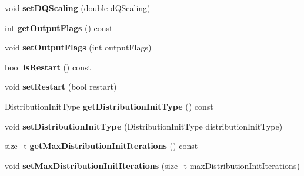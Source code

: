 \begin{DoxyCompactItemize}
\item 
\hypertarget{classnatrium_1_1SolverConfiguration_a25f4b8ac9b325f455c5c273d75ed7551}{void {\bfseries set\-D\-Q\-Scaling} (double d\-Q\-Scaling)}\label{classnatrium_1_1SolverConfiguration_a25f4b8ac9b325f455c5c273d75ed7551}

\item 
\hypertarget{classnatrium_1_1SolverConfiguration_ac2edb568e16cf38fc7fa5aa0b45532ff}{int {\bfseries get\-Output\-Flags} () const }\label{classnatrium_1_1SolverConfiguration_ac2edb568e16cf38fc7fa5aa0b45532ff}

\item 
\hypertarget{classnatrium_1_1SolverConfiguration_a098031e207af99ebfadee20b4341eabd}{void {\bfseries set\-Output\-Flags} (int output\-Flags)}\label{classnatrium_1_1SolverConfiguration_a098031e207af99ebfadee20b4341eabd}

\item 
\hypertarget{classnatrium_1_1SolverConfiguration_a6bd8b754c338c4505b51c0ef3a1ebe37}{bool {\bfseries is\-Restart} () const }\label{classnatrium_1_1SolverConfiguration_a6bd8b754c338c4505b51c0ef3a1ebe37}

\item 
\hypertarget{classnatrium_1_1SolverConfiguration_afa537a3371bd51a7a042481df76a7c3b}{void {\bfseries set\-Restart} (bool restart)}\label{classnatrium_1_1SolverConfiguration_afa537a3371bd51a7a042481df76a7c3b}

\item 
\hypertarget{classnatrium_1_1SolverConfiguration_aada76bc5babb994525964b8a1143bb15}{Distribution\-Init\-Type {\bfseries get\-Distribution\-Init\-Type} () const }\label{classnatrium_1_1SolverConfiguration_aada76bc5babb994525964b8a1143bb15}

\item 
\hypertarget{classnatrium_1_1SolverConfiguration_aed9dc4e2b88e7a76998fed4e69b6c5dc}{void {\bfseries set\-Distribution\-Init\-Type} (Distribution\-Init\-Type distribution\-Init\-Type)}\label{classnatrium_1_1SolverConfiguration_aed9dc4e2b88e7a76998fed4e69b6c5dc}

\item 
\hypertarget{classnatrium_1_1SolverConfiguration_af1d809d9a559efda0a66736dcb64c430}{size\-\_\-t {\bfseries get\-Max\-Distribution\-Init\-Iterations} () const }\label{classnatrium_1_1SolverConfiguration_af1d809d9a559efda0a66736dcb64c430}

\item 
\hypertarget{classnatrium_1_1SolverConfiguration_a96aa9a31e4d4bee62df8d7bceccd6854}{void {\bfseries set\-Max\-Distribution\-Init\-Iterations} (size\-\_\-t max\-Distribution\-Init\-Iterations)}\label{classnatrium_1_1SolverConfiguration_a96aa9a31e4d4bee62df8d7bceccd6854}


\end{DoxyCompactItemize}
